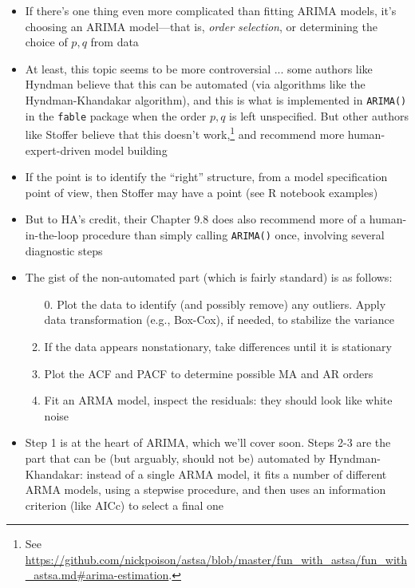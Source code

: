 \documentclass{article}
\begin{document}
\begin{itemize}
\item If there's one thing even more complicated than fitting ARIMA models, it's
  choosing an ARIMA model---that is, \emph{order selection}, or determining the 
  choice of $p,q$ from data 

\item At least, this topic seems to be more controversial ... some authors like
  Hyndman believe that this can be automated (via algorithms like the
  Hyndman-Khandakar algorithm), and this is what is implemented in
  \verb|ARIMA()| in the \verb|fable| package when the order $p,q$ is left 
  unspecified. But other authors like Stoffer believe that this doesn't
  work,\footnote{See
    \url{https://github.com/nickpoison/astsa/blob/master/fun_with_astsa/fun_with_astsa.md\#arima-estimation}.} 
  and recommend more human-expert-driven model building  

\item If the point is to identify the ``right'' structure, from a model
  specification point of view, then Stoffer may have a point (see R notebook 
  examples) 

\item But to HA's credit, their Chapter 9.8 does also recommend more of a 
  human-in-the-loop procedure than simply calling \verb|ARIMA()| once, involving
  several diagnostic steps 

\item The gist of the non-automated part (which is fairly standard) is as
  follows: 
  \begin{enumerate}
  \item[0.] Plot the data to identify (and possibly remove) any outliers. 
   Apply data transformation (e.g., Box-Cox), if needed, to stabilize the
   variance   
  \item If the data appears nonstationary, take differences until it is
    stationary 
  \item Plot the ACF and PACF to determine possible MA and AR orders 
  \item Fit an ARMA model, inspect the residuals: they should look like white 
    noise 
  \end{enumerate}

\item Step 1 is at the heart of ARIMA, which we'll cover soon. Steps 2-3 are the
  part that can be (but arguably, should not be) automated by Hyndman-Khandakar:  
  instead of a single ARMA model, it fits a number of different ARMA models,
  using a stepwise procedure, and then uses an information criterion (like AICc)
  to select a final one 


\end{itemize}
\end{document}
